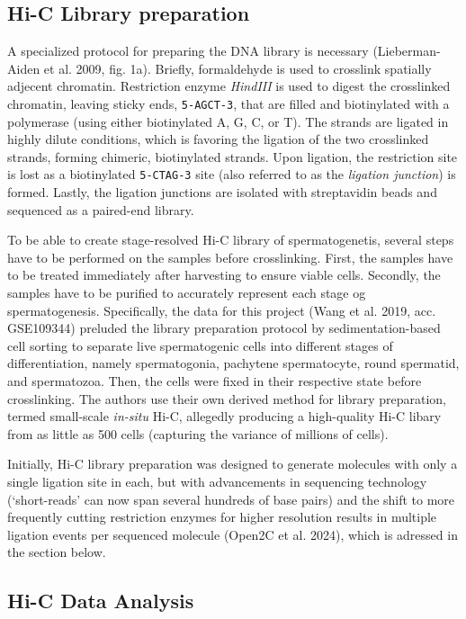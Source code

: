 \documentclass[
  11pt,
  a4paper,
]{scrbook}
\begin{document}
\subsection{Hi-C Library preparation}\label{hi-c-library-preparation}

A specialized protocol for preparing the DNA library is necessary
(Lieberman-Aiden et al. 2009, fig. 1a). Briefly, formaldehyde is used to
crosslink spatially adjecent chromatin. Restriction enzyme
\emph{HindIII} is used to digest the crosslinked chromatin, leaving
sticky ends, \texttt{5-AGCT-3}, that are filled and biotinylated with a
polymerase (using either biotinylated A, G, C, or T). The strands are
ligated in highly dilute conditions, which is favoring the ligation of
the two crosslinked strands, forming chimeric, biotinylated strands.
Upon ligation, the restriction site is lost as a biotinylated
\texttt{5-CTAG-3} site (also referred to as the \emph{ligation
junction}) is formed. Lastly, the ligation junctions are isolated with
streptavidin beads and sequenced as a paired-end library.

To be able to create stage-resolved Hi-C library of spermatogenetis,
several steps have to be performed on the samples before crosslinking.
First, the samples have to be treated immediately after harvesting to
ensure viable cells. Secondly, the samples have to be purified to
accurately represent each stage og spermatogenesis. Specifically, the
data for this project (Wang et al. 2019, acc. GSE109344) preluded the
library preparation protocol by sedimentation-based cell sorting to
separate live spermatogenic cells into different stages of
differentiation, namely spermatogonia, pachytene spermatocyte, round
spermatid, and spermatozoa. Then, the cells were fixed in their
respective state before crosslinking. The authors use their own derived
method for library preparation, termed small-scale \emph{in-situ} Hi-C,
allegedly producing a high-quality Hi-C libary from as little as 500
cells (capturing the variance of millions of cells).

Initially, Hi-C library preparation was designed to generate molecules
with only a single ligation site in each, but with advancements in
sequencing technology (`short-reads' can now span several hundreds of
base pairs) and the shift to more frequently cutting restriction enzymes
for higher resolution results in multiple ligation events per sequenced
molecule (Open2C et al. 2024), which is adressed in the section below.

\subsection{Hi-C Data Analysis}\label{hi-c-data-analysis}
\end{document}
